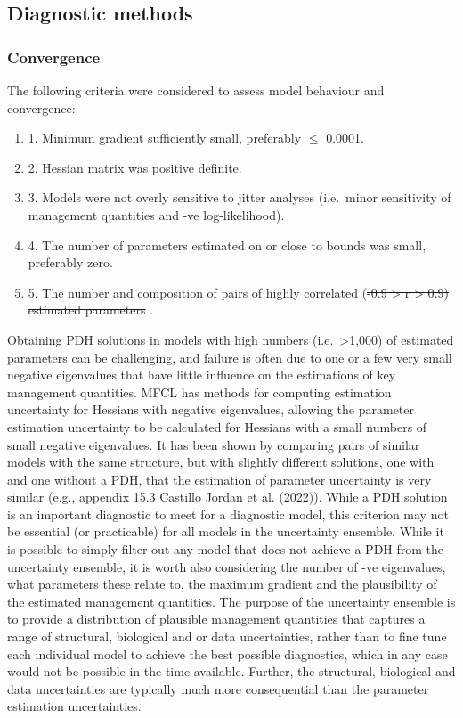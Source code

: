 \documentclass[
  english,
  a4paper,
  a4paper,
  11pt]{SCreport}
\providecommand{\DIFadd}[1]{{\protect\color{blue}\uwave{#1}}} %
\providecommand{\DIFdel}[1]{{\protect\color{red}\sout{#1}}}                      %
\providecommand{\DIFaddbegin}{} %
\providecommand{\DIFaddend}{} %
\providecommand{\DIFdelbegin}{} %
\providecommand{\DIFdelend}{} %
\newcommand{\DIFscaledelfig}{0.5}
\newlength{\DIFdelgraphicswidth} %
\newlength{\DIFdelgraphicsheight} %
\newcommand{\DIFaddincludegraphics}[2][]{{\color{blue}\fbox{\DIFOincludegraphics[#1]{#2}}}} %
\newcommand{\DIFdelincludegraphics}[2][]{%
\sbox{\DIFdelgraphicsbox}{\DIFOincludegraphics[#1]{#2}}%
\settoboxwidth{\DIFdelgraphicswidth}{\DIFdelgraphicsbox} %
\settoboxtotalheight{\DIFdelgraphicsheight}{\DIFdelgraphicsbox} %
\scalebox{\DIFscaledelfig}{%
\parbox[b]{\DIFdelgraphicswidth}{\usebox{\DIFdelgraphicsbox}\\[-\baselineskip] \rule{\DIFdelgraphicswidth}{0em}}\llap{\resizebox{\DIFdelgraphicswidth}{\DIFdelgraphicsheight}{%
\setlength{\unitlength}{\DIFdelgraphicswidth}%
\begin{picture}(1,1)%
\thicklines\linethickness{2pt} %
{\color[rgb]{1,0,0}\put(0,0){\framebox(1,1){}}}%
{\color[rgb]{1,0,0}\put(0,0){\line( 1,1){1}}}%
{\color[rgb]{1,0,0}\put(0,1){\line(1,-1){1}}}%
\end{picture}%
}\hspace*{3pt}}} %
} %
\DeclareRobustCommand{\DIFaddbegin}{\DIFOaddbegin \let\includegraphics\DIFaddincludegraphics} %
\DeclareRobustCommand{\DIFaddend}{\DIFOaddend \let\includegraphics\DIFOincludegraphics} %
\DeclareRobustCommand{\DIFdelbegin}{\DIFOdelbegin \let\includegraphics\DIFdelincludegraphics} %
\DeclareRobustCommand{\DIFdelend}{\DIFOaddend \let\includegraphics\DIFOincludegraphics} %
\begin{document}
\subsection{Diagnostic methods}\label{sec-diagnostic-methods}

\subsubsection{Convergence}\label{convergence}

The following criteria were considered to assess model behaviour and
convergence:

\begin{enumerate}
\def\labelenumi{\arabic{enumi}.}
\item
  1. Minimum gradient sufficiently small, preferably \(\leq\) 0.0001.
\item
  2. Hessian matrix was positive definite.
\item
  3. Models were not overly sensitive to jitter analyses (i.e.~minor
  sensitivity of management quantities and -ve log-likelihood).
\item
  4. The number of parameters estimated on or close to bounds was small,
  preferably zero.
\item
  5. The number and composition of pairs of highly correlated \DIFaddbegin \DIFadd{estimated
  parameters }\DIFaddend (\DIFdelbegin \DIFdel{-0.9
  \textgreater{} r \textgreater{} 0.9) estimated
  parameters }\DIFdelend \DIFaddbegin \DIFadd{\(|r| > 0.90\))}\DIFaddend .
\end{enumerate}

Obtaining PDH solutions in models with high numbers
(i.e.~\textgreater1,000) of estimated parameters can be challenging, and
failure is often due to one or a few very small negative eigenvalues
that have little influence on the estimations of key management
quantities. MFCL has methods for computing estimation uncertainty for
Hessians with negative eigenvalues, allowing the parameter estimation
uncertainty to be calculated for Hessians with a small numbers of small
negative eigenvalues. It has been shown by comparing pairs of similar
models with the same structure, but with slightly different solutions,
one with and one without a PDH, that the estimation of parameter
uncertainty is very similar (e.g., appendix 15.3 Castillo Jordan et al.
(2022)). While a PDH solution is an important diagnostic to meet for a
diagnostic model, this criterion may not be essential (or practicable)
for all models in the uncertainty ensemble. While it is possible to
simply filter out any model that does not achieve a PDH from the
uncertainty ensemble, it is worth also considering the number of -ve
eigenvalues, what parameters these relate to, the maximum gradient and
the plausibility of the estimated management quantities. The purpose of
the uncertainty ensemble is to provide a distribution of plausible
management quantities that captures a range of structural, biological
and or data uncertainties, rather than to fine tune each individual
model to achieve the best possible diagnostics, which in any case would
not be possible in the time available. Further, the structural,
biological and data uncertainties are typically much more consequential
than the parameter estimation uncertainties.
\end{document}
